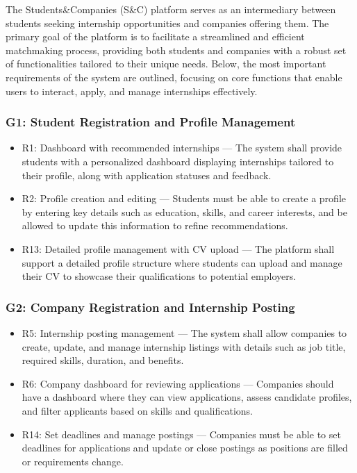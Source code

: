 The Students\&Companies (S\&C) platform serves as an intermediary between students seeking internship opportunities and companies offering them. The primary goal of the platform is to facilitate a streamlined and efficient matchmaking process, providing both students and companies with a robust set of functionalities tailored to their unique needs. Below, the most important requirements of the system are outlined, focusing on core functions that enable users to interact, apply, and manage internships effectively.

\subsubsection{G1: Student Registration and Profile Management}
    \begin{itemize}
        \item R1: Dashboard with recommended internships — The system shall provide students with a personalized dashboard displaying internships tailored to their profile, along with application statuses and feedback.
        \item R2: Profile creation and editing — Students must be able to create a profile by entering key details such as education, skills, and career interests, and be allowed to update this information to refine recommendations.
        \item R13: Detailed profile management with CV upload — The platform shall support a detailed profile structure where students can upload and manage their CV to showcase their qualifications to potential employers.
    \end{itemize}

\subsubsection{G2: Company Registration and Internship Posting}
    \begin{itemize}
        \item R5: Internship posting management — The system shall allow companies to create, update, and manage internship listings with details such as job title, required skills, duration, and benefits.
        \item R6: Company dashboard for reviewing applications — Companies should have a dashboard where they can view applications, assess candidate profiles, and filter applicants based on skills and qualifications.
        \item R14: Set deadlines and manage postings — Companies must be able to set deadlines for applications and update or close postings as positions are filled or requirements change.
    \end{itemize}

